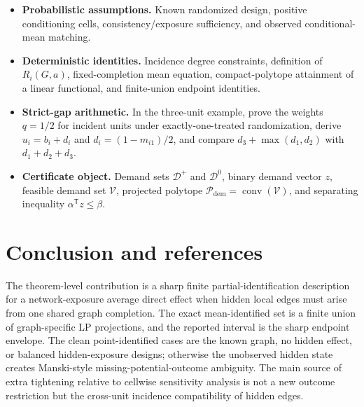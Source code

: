 \documentclass[11pt]{article}
\newcommand{\transpose}{\mathsf{T}}
\theoremstyle{definition}
\theoremstyle{plain}
\theoremstyle{remark}
\begin{document}
\begin{itemize}[leftmargin=*]
\item \textbf{Probabilistic assumptions.}  Known randomized design, positive
conditioning cells, consistency/exposure sufficiency, and observed
conditional-mean matching.

\item \textbf{Deterministic identities.}  Incidence degree constraints,
definition of \(R_i(G,a)\), fixed-completion mean equation, compact-polytope
attainment of a linear functional, and finite-union endpoint identities.

\item \textbf{Strict-gap arithmetic.}  In the three-unit example, prove the
weights \(q=1/2\) for incident units under exactly-one-treated randomization,
derive \(u_i=b_i+d_i\) and \(d_i=(1-m_{i1})/2\), and compare
\(d_3+\max(d_1,d_2)\) with \(d_1+d_2+d_3\).

\item \textbf{Certificate object.}  Demand sets \(\mathcal D^+\) and
\(\mathcal D^0\), binary demand vector \(z\), feasible demand set
\(\mathcal V\), projected polytope \(\mathcal P_{\mathrm{dem}}=\operatorname{conv}
(\mathcal V)\), and separating inequality \(\alpha^\transpose z\le\beta\).
\end{itemize}

\section{Conclusion and references}
The theorem-level contribution is a sharp finite partial-identification
description for a network-exposure average direct effect when hidden local edges
must arise from one shared graph completion.  The exact mean-identified set is a
finite union of graph-specific LP projections, and the reported interval is the
sharp endpoint envelope.  The clean point-identified cases are the known graph,
no hidden effect, or balanced hidden-exposure designs; otherwise the unobserved
hidden state creates Manski-style missing-potential-outcome ambiguity.  The main
source of extra tightening relative to cellwise sensitivity analysis is not a
new outcome restriction but the cross-unit incidence compatibility of hidden
edges.
\end{document}
